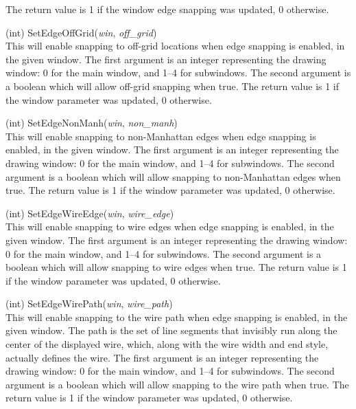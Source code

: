 \begin{description}
The return value is 1 if the window edge snapping was updated, 0
otherwise. 
 
\item{(int) \vt SetEdgeOffGrid({\it win}, {\it off\_grid\/})}\\
This will enable snapping to off-grid locations when edge snapping is
enabled, in the given window.  The first argument is an integer
representing the drawing window:  0 for the main window, and 1--4 for
subwindows.  The second argument is a boolean which will allow
off-grid snapping when true.  The return value is 1 if the window
parameter was updated, 0 otherwise.

\item{(int) \vt SetEdgeNonManh({\it win}, {\it non\_manh\/})}\\
This will enable snapping to non-Manhattan edges when edge snapping is
enabled, in the given window.  The first argument is an integer
representing the drawing window:  0 for the main window, and 1--4 for
subwindows.  The second argument is a boolean which will allow
snapping to non-Manhattan edges when true.  The return value is 1 if
the window parameter was updated, 0 otherwise.

\item{(int) \vt SetEdgeWireEdge({\it win}, {\it wire\_edge\/})}\\
This will enable snapping to wire edges when edge snapping is enabled,
in the given window.  The first argument is an integer representing
the drawing window:  0 for the main window, and 1--4 for subwindows. 
The second argument is a boolean which will allow snapping to wire
edges when true.  The return value is 1 if the window parameter was
updated, 0 otherwise.

\item{(int) \vt SetEdgeWirePath({\it win}, {\it wire\_path\/})}\\
This will enable snapping to the wire path when edge snapping is
enabled, in the given window.  The path is the set of line segments
that invisibly run along the center of the displayed wire, which,
along with the wire width and end style, actually defines the wire. 
The first argument is an integer representing the drawing window:  0
for the main window, and 1--4 for subwindows.  The second argument is
a boolean which will allow snapping to the wire path when true.  The
return value is 1 if the window parameter was updated, 0 otherwise.


\end{description}

